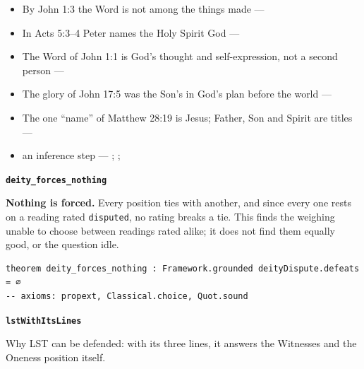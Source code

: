 \documentclass[11pt,paper=\testimonypaper,DIV=13,parskip=false]{scrartcl}
\begin{document}
\begin{itemize}
\begin{itemize}
\item By John 1:3 the Word is not among the things made --- \cite[Tractates on John I.11]{schaff-nicene-post-nicene-fathers-1-7}
\item In Acts 5:3–4 Peter names the Holy Spirit God --- \cite[198]{calvin-commentary-acts-1844}
\item The Word of John 1:1 is God’s thought and self-expression, not a second person --- \cite[ch. 4 and 8, on John 1:1]{bernard-oneness-of-god-1983}
\item The glory of John 17:5 was the Son’s in God’s plan before the world --- \cite[ch. 8, The Preexistence of Jesus]{bernard-oneness-of-god-1983}
\item The one “name” of Matthew 28:19 is Jesus; Father, Son and Spirit are titles --- \cite[ch. 6, Matthew 28:19]{bernard-oneness-of-god-1983}
\item an inference step --- \cite[3, The Triune God]{kibbey-living-systematic-theology-2026}; \cite[ch. 4, Conclusion]{bernard-oneness-of-god-1983}; \cite[17--19]{buzzard-caveat-lector-2001}
\end{itemize}
\end{itemize}
\par\medskip\noindent\textbf{\texttt{deity\_\allowbreak{}forces\_\allowbreak{}nothing}}\par\nobreak\noindent
\textbf{Nothing is forced.} Every position ties with another, and since every one rests on a reading rated \texttt{disputed}, no rating breaks a tie. This finds the weighing unable to choose between readings rated alike; it does not find them equally good, or the question idle.

{\small\begin{verbatim}
theorem deity_forces_nothing : Framework.grounded deityDispute.defeats = ∅
-- axioms: propext, Classical.choice, Quot.sound
\end{verbatim}}
\par\medskip\noindent\textbf{\texttt{lst\allowbreak{}With\allowbreak{}Its\allowbreak{}Lines}}\par\nobreak\noindent
Why LST can be defended: with its three lines, it answers the Witnesses and the Oneness position itself.
\end{document}

